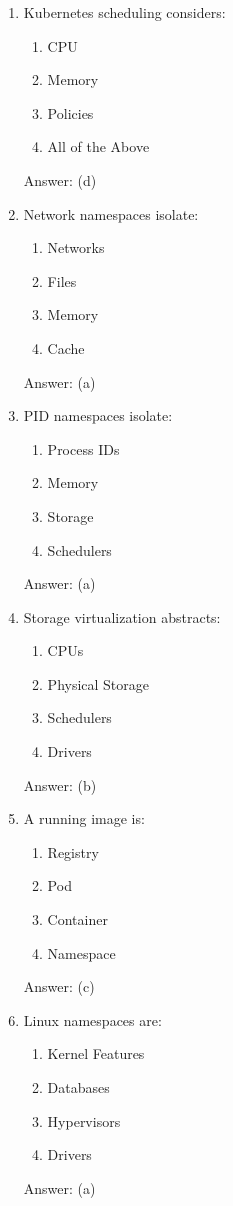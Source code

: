 \begin{enumerate}
\item Kubernetes scheduling considers:
\begin{enumerate}[label=(\alph*)]
\item CPU
\item Memory
\item Policies
\item All of the Above
\end{enumerate}
Answer: (d)

\item Network namespaces isolate:
\begin{enumerate}[label=(\alph*)]
\item Networks
\item Files
\item Memory
\item Cache
\end{enumerate}
Answer: (a)

\item PID namespaces isolate:
\begin{enumerate}[label=(\alph*)]
\item Process IDs
\item Memory
\item Storage
\item Schedulers
\end{enumerate}
Answer: (a)

\item Storage virtualization abstracts:
\begin{enumerate}[label=(\alph*)]
\item CPUs
\item Physical Storage
\item Schedulers
\item Drivers
\end{enumerate}
Answer: (b)

\item A running image is:
\begin{enumerate}[label=(\alph*)]
\item Registry
\item Pod
\item Container
\item Namespace
\end{enumerate}
Answer: (c)

\item Linux namespaces are:
\begin{enumerate}[label=(\alph*)]
\item Kernel Features
\item Databases
\item Hypervisors
\item Drivers
\end{enumerate}
Answer: (a)


\end{enumerate}
